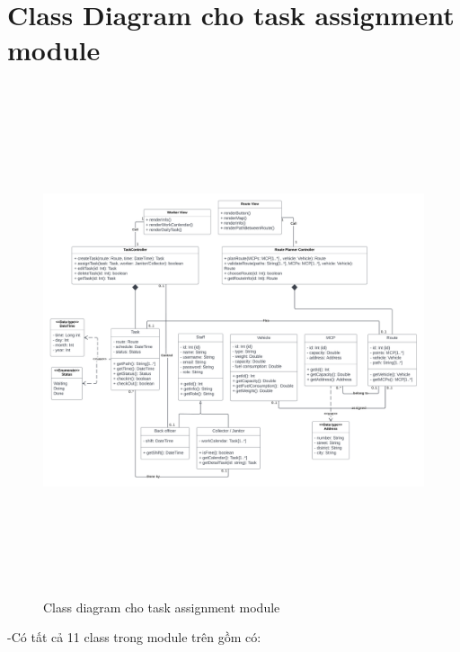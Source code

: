 
\section{Class Diagram cho task assignment module}
    \begin{figure}[h]
        \centering
        \includegraphics[width=18.0cm,height=15cm]{imgs/class diagram/UWC class diagram.png}
        \caption{Class diagram cho task assignment module}
    \end{figure}
    \newpage
    -Có tất cả 11 class trong module trên gồm có:
